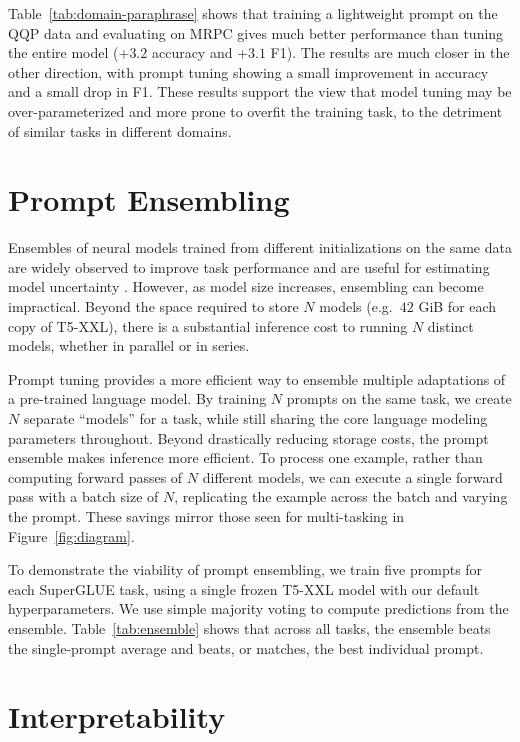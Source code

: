 Table~\ref{tab:domain-paraphrase} shows that training a lightweight prompt on the QQP data and evaluating on MRPC gives much better performance than tuning the entire model (+$3.2$ accuracy and +$3.1$ F1). The results are much closer in the other direction, with prompt tuning showing a small improvement in accuracy and a small drop in F1\@. These results support the view that model tuning may be over-parameterized and more prone to overfit the training task, to the detriment of similar tasks in different domains.

\section{Prompt Ensembling}
\label{sec:ensemble}

Ensembles of neural models trained from different initializations on the same data are widely observed to improve task performance \cite{hansen_1990_ensembles} and are useful for estimating model uncertainty \cite{lakshminarayanan_2017_deep_ensembles}. However, as model size increases, ensembling can become impractical. Beyond the space required to store $N$ models (e.g.\ $42$ GiB for each copy of T5-XXL), there is a substantial inference cost to running $N$ distinct models, whether in parallel or in series.

Prompt tuning provides a more efficient way to ensemble multiple adaptations of a pre-trained language model. By training $N$ prompts on the same task, we create $N$ separate ``models'' for a task, while still sharing the core language modeling parameters throughout. Beyond drastically reducing storage costs, the prompt ensemble makes inference more efficient. To process one example, rather than computing forward passes of $N$ different models, we can execute a single forward pass with a batch size of $N$, replicating the example across the batch and varying the prompt. These savings mirror those seen for multi-tasking in Figure~\ref{fig:diagram}.

To demonstrate the viability of prompt ensembling, we train five prompts for each SuperGLUE task, using a single frozen T5-XXL model with our default hyperparameters. We use simple majority voting to compute predictions from the ensemble. Table~\ref{tab:ensemble} shows that across all tasks, the ensemble beats the single-prompt average and beats, or matches, the best individual prompt.

\section{Interpretability}
\label{sec:interpretability}

